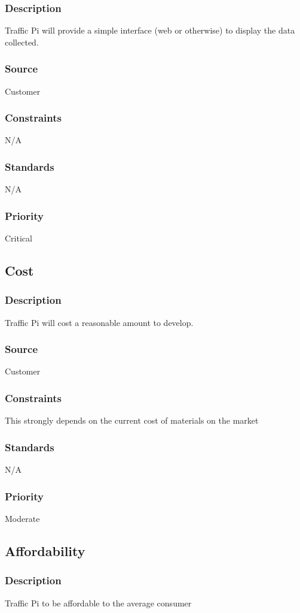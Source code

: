 \subsubsection{Description}
Traffic Pi will provide a simple interface (web or otherwise) to display the data collected. 
\subsubsection{Source}
Customer
\subsubsection{Constraints}
N/A
\subsubsection{Standards}
N/A
\subsubsection{Priority}
Critical

\subsection{Cost}
\subsubsection{Description}
Traffic Pi will cost a reasonable amount to develop.
\subsubsection{Source}
Customer
\subsubsection{Constraints}
This strongly depends on the current cost of materials on the market
\subsubsection{Standards}
N/A
\subsubsection{Priority}
Moderate

\subsection{Affordability}
\subsubsection{Description}
Traffic Pi to be affordable to the average consumer
